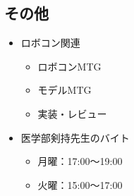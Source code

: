 \documentclass[uplatex, onecolumn, 10pt]{jsarticle}
\begin{document}
\subsection*{その他}
\begin{itemize}
    \item ロボコン関連
		\begin{itemize}
			\item ロボコンMTG
			\item モデルMTG
			\item 実装・レビュー
		\end{itemize}
    \item 医学部剣持先生のバイト
    \begin{itemize}
			\item 月曜：17:00～19:00
			\item 火曜：15:00～17:00
		\end{itemize}
\end{itemize}
\end{document}
